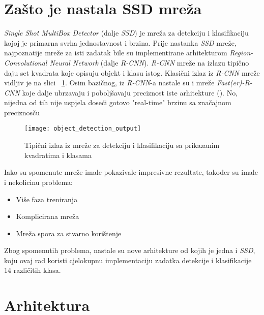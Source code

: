 \section{Zašto je nastala SSD mreža}
\emph{Single Shot MultiBox Detector} (dalje \emph{SSD}) je mreža za detekciju i klasifikaciju kojoj je primarna svrha jednostavnost i brzina.
Prije nastanka \emph{SSD} mreže, najpoznatije mreže za isti zadatak bile su implementirane arhitekturom \emph{Region-Convolutional Neural Network} (dalje \emph{R-CNN}).
\emph{R-CNN} mreže na izlazu tipično daju set kvadrata koje opisuju objekt i klasu istog.
Klasični izlaz iz \emph{R-CNN} mreže vidljiv je na slici ~\ref{fig:ObjectDetectionOutput}.
Osim bazičnog, iz \emph{R-CNN}-a nastale su i mreže \emph{Fast(er)-R-CNN} koje dalje ubrzavaju i poboljšavaju preciznost iste arhitekture (\cite{ren2015faster}).
No, nijedna od tih nije uspjela doseći gotovo "real-time" brzinu sa značajnom preciznosču
\begin{figure}[h!]
	\centering
	\texttt{[image: object\_detection\_output]}
	 \caption{Tipični izlaz iz mreže za detekciju i klasifikaciju sa prikazanim kvadratima i klasama}
 	 \label{fig:ObjectDetectionOutput}
\end{figure}
Iako su spomenute mreže imale pokazivale impresivne rezultate, također su imale i nekolicinu problema:
\begin{itemize}
\item Više faza treniranja
\item Komplicirana mreža
\item Mreža spora za stvarno korištenje
\end{itemize}
Zbog spomenutih problema, nastale su nove arhitekture od kojih je jedna i \emph{SSD}, koju ovaj rad koristi cjelokupnu implementaciju zadatka detekcije i klasifikacije 14 različitih klasa.

\section{Arhitektura}

